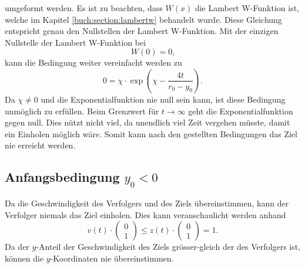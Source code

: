 umgeformt werden.
Es ist zu beachten, dass $W(x)$ die Lambert W-Funktion ist, welche im Kapitel  \eqref{buch:section:lambertw} behandelt wurde.
Diese Gleichung entspricht genau den Nullstellen der Lambert W-Funktion. Mit der einzigen Nullstelle der Lambert W-Funktion bei
\begin{equation*}
    W(0)=0
    \text{,}
\end{equation*}
kann die Bedingung weiter vereinfacht werden zu
\begin{equation}
    0
    =
    \chi\cdot \exp\left( \chi-\frac{4t}{r_0-y_0}\right)
    \text{.}
\end{equation}
Da $\chi\neq0$ und die Exponentialfunktion nie null sein kann, ist diese Bedingung unmöglich zu erfüllen.
Beim Grenzwert für $t\rightarrow\infty$ geht die Exponentialfunktion gegen null.
Dies nützt nicht viel, da unendlich viel Zeit vergehen müsste, damit ein Einholen möglich wäre.
Somit kann nach den gestellten Bedingungen das Ziel nie erreicht werden.
%
%
%
%
%
%
%
%
%
\subsection{Anfangsbedingung $y_0<0$}
Da die Geschwindigkeit des Verfolgers und des Ziels übereinstimmen, kann der Verfolger niemals das Ziel einholen.
Dies kann veranschaulicht werden anhand
%
\begin{equation}
    v(t)\cdot \left( \begin{array}{c} 0 \\ 1 \end{array}\right) 
    \leq
    z(t)\cdot \left( \begin{array}{c} 0 \\ 1 \end{array}\right) 
    =
    1\text{.}
\end{equation}
%
Da der $y$-Anteil der Geschwindigkeit des Ziels grösser-gleich der des Verfolgers ist, können die $y$-Koordinaten nie übereinstimmen.
%
